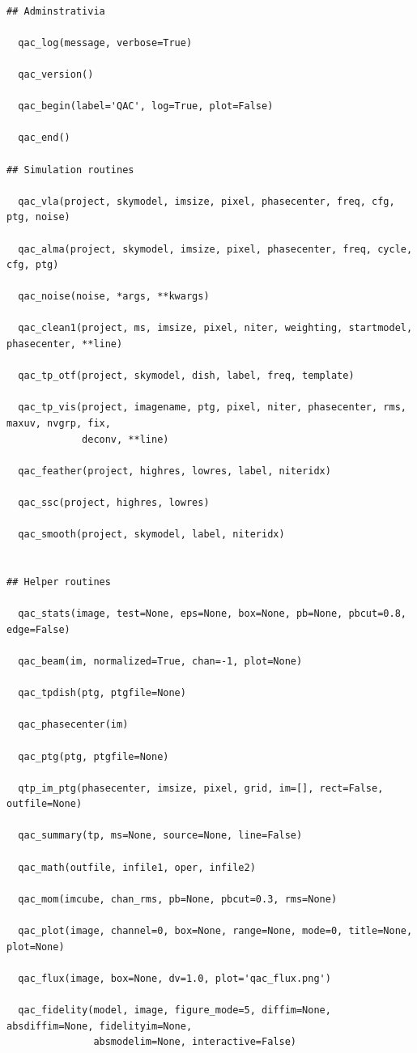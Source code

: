 \documentclass[11pt,twoside]{article}
\begin{document}
\footnotesize
\begin{verbatim}

## Adminstrativia

  qac_log(message, verbose=True)

  qac_version()

  qac_begin(label='QAC', log=True, plot=False)

  qac_end()

## Simulation routines

  qac_vla(project, skymodel, imsize, pixel, phasecenter, freq, cfg, ptg, noise)

  qac_alma(project, skymodel, imsize, pixel, phasecenter, freq, cycle, cfg, ptg)

  qac_noise(noise, *args, **kwargs)

  qac_clean1(project, ms, imsize, pixel, niter, weighting, startmodel, phasecenter, **line)

  qac_tp_otf(project, skymodel, dish, label, freq, template)

  qac_tp_vis(project, imagename, ptg, pixel, niter, phasecenter, rms, maxuv, nvgrp, fix,
             deconv, **line)

  qac_feather(project, highres, lowres, label, niteridx)

  qac_ssc(project, highres, lowres)

  qac_smooth(project, skymodel, label, niteridx)


## Helper routines

  qac_stats(image, test=None, eps=None, box=None, pb=None, pbcut=0.8, edge=False)

  qac_beam(im, normalized=True, chan=-1, plot=None)

  qac_tpdish(ptg, ptgfile=None)

  qac_phasecenter(im)

  qac_ptg(ptg, ptgfile=None)

  qtp_im_ptg(phasecenter, imsize, pixel, grid, im=[], rect=False, outfile=None)

  qac_summary(tp, ms=None, source=None, line=False)

  qac_math(outfile, infile1, oper, infile2)

  qac_mom(imcube, chan_rms, pb=None, pbcut=0.3, rms=None)

  qac_plot(image, channel=0, box=None, range=None, mode=0, title=None, plot=None)

  qac_flux(image, box=None, dv=1.0, plot='qac_flux.png')

  qac_fidelity(model, image, figure_mode=5, diffim=None, absdiffim=None, fidelityim=None,
               absmodelim=None, interactive=False)

\end{verbatim}
\normalsize
\end{document}
